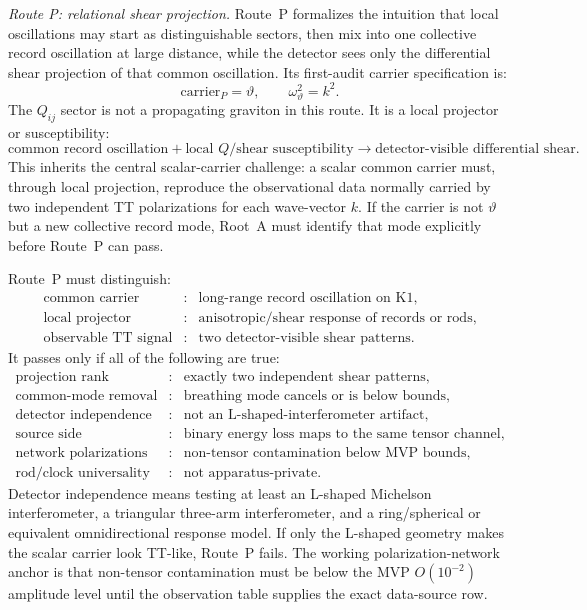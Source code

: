 \documentclass[11pt]{article}
\begin{document}
\medskip\noindent\textit{Route P: relational shear projection.}
Route~P formalizes the intuition that local oscillations may start as
distinguishable sectors, then mix into one collective record oscillation at
large distance, while the detector sees only the differential shear projection
of that common oscillation.  Its first-audit carrier specification is:
\[
\boxed{
\text{carrier}_{P}=\vartheta,\qquad
\omega_\vartheta^2=k^2.
}
\]
The \(Q_{ij}\) sector is not a propagating graviton in this route.  It is a
local projector or susceptibility:
\[
\boxed{
\text{common record oscillation}+\text{local }Q\text{/shear susceptibility}
\longrightarrow \text{detector-visible differential shear}.
}
\]
This inherits the central scalar-carrier challenge: a scalar common carrier
must, through local projection, reproduce the observational data normally
carried by two independent TT polarizations for each wave-vector \(k\).  If
the carrier is not \(\vartheta\) but a new collective record mode, Root~A must
identify that mode explicitly before Route~P can pass.

Route~P must distinguish:
\[
\boxed{
\begin{array}{lll}
\text{common carrier} &:& \text{long-range record oscillation on K1},\\
\text{local projector} &:& \text{anisotropic/shear response of records or rods},\\
\text{observable TT signal} &:& \text{two detector-visible shear patterns}.
\end{array}}
\]
It passes only if all of the following are true:
\[
\boxed{
\begin{array}{lll}
\text{projection rank} &:& \text{exactly two independent shear patterns},\\
\text{common-mode removal} &:& \text{breathing mode cancels or is below bounds},\\
\text{detector independence} &:& \text{not an L-shaped-interferometer artifact},\\
\text{source side} &:& \text{binary energy loss maps to the same tensor channel},\\
\text{network polarizations} &:& \text{non-tensor contamination below MVP bounds},\\
\text{rod/clock universality} &:& \text{not apparatus-private}.
\end{array}}
\]
Detector independence means testing at least an L-shaped Michelson
interferometer, a triangular three-arm interferometer, and a ring/spherical or
equivalent omnidirectional response model.  If only the L-shaped geometry
makes the scalar carrier look TT-like, Route~P fails.  The working
polarization-network anchor is that non-tensor contamination must be below
the MVP \(O(10^{-2})\) amplitude level until the observation table supplies
the exact data-source row.
\end{document}
